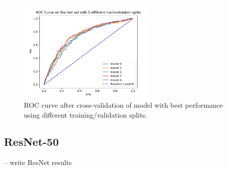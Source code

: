 \documentclass[sn-mathphys,Numbered]{sn-jnl}%
\theoremstyle{thmstyleone}%
\theoremstyle{thmstyletwo}%
\theoremstyle{thmstylethree}%
\begin{document}
\begin{figure}[h]%
\centering
\includegraphics[width=0.6\textwidth]{final_roc.pdf}
\caption{ROC curve after cross-validation of model with best performance using different training/validation splits.}\label{final-roc}
\end{figure}
\newpage


\subsection{ResNet-50}\label{ResNet_Results}
-- write ResNet results
\end{document}
